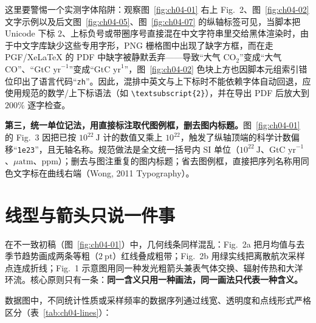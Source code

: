 这里要警惕一个实测字体陷阱：观察图~\ref{fig:ch04-01} 右上 Fig.\ 2、图~\ref{fig:ch04-02} 文字示例以及后文图~\ref{fig:ch04-05}、图~\ref{fig:ch04-07} 的纵轴标签可见，当脚本把 Unicode 下标 $2$、上标负号或带圈序号直接混在中文字符串里交给黑体渲染时，由于中文字库缺少这些专用字形，PNG 栅格图中出现了缺字方框，而在走 PGF/XeLaTeX 的 PDF 中缺字被静默丢弃——导致“大气 $\text{CO}_2$”变成“大气 CO”、“$\text{GtC yr}^{-1}$”变成“$\text{GtC yr}^{1}$”，图~\ref{fig:ch04-02} 色块上方也因脚本元组索引错位印出了语言代码“\texttt{zh}”。因此，混排中英文与上下标时不能依赖字体自动回退，应使用规范的数学/上下标语法（如 \texttt{\textbackslash textsubscript\{2\}}），并在导出 PDF 后放大到 $200\%$ 逐字检查。

\textbf{第三，统一单位记法，用直接标注取代图例框，删去图内标题。}图~\ref{fig:ch04-01} 的 Fig.\ 3 因把已按 $10^{22}\ \text{J}$ 计的数值又乘上 $10^{22}$，触发了纵轴顶端的科学计数偏移“\texttt{1e23}”，且无轴名称。规范做法是全文统一括号内 SI 单位（$10^{22}\ \text{J}$、$\text{GtC yr}^{-1}$、$\mu\text{atm}$、ppm）；删去与图注重复的图内标题；省去图例框，直接把序列名称用同色文字标在曲线右端（Wong, 2011 Typography）。

\section{线型与箭头只说一件事}

在不一致初稿（图~\ref{fig:ch04-01}）中，几何线条同样混乱：Fig.\ 2a 把月均值与去季节趋势画成两条等粗（$2\ \text{pt}$）红线叠成粗带；Fig.\ 2b 用绿实线把离散航次采样点连成折线；Fig.\ 1 示意图用同一种发光粗箭头兼表气体交换、辐射传热和大洋环流。核心原则只有一条：\textbf{同一含义只用一种画法，同一画法只代表一种含义。}

数据图中，不同统计性质或采样频率的数据序列通过线宽、透明度和点线形式严格区分（表~\ref{tab:ch04-lines}）：


